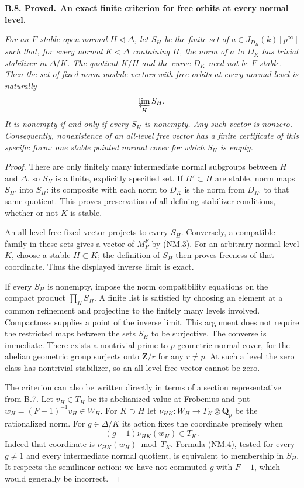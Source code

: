 \documentclass[11pt,a4paper]{article}
\newcommand{\Z}{\mathbf Z}
\newcommand{\Q}{\mathbf Q}
\newenvironment{claim}[3]{\par\medskip\noindent\hypertarget{#1}{\textbf{#1. #2.}}\ \textbf{#3.}\par\nopagebreak\smallskip\begingroup\itshape}{\endgroup\par\smallskip}
\newcommand{\statementref}[1]{\hyperlink{#1}{#1}}
\begin{document}
\begin{claim}{B.8}{Proved}{An exact finite criterion for free orbits at every normal level}
For an $F$-stable open normal $H\triangleleft\Delta$, let $S_H$
be the finite set of $a\in J_{D_H}(k)[p^\infty]$ such that, for
every normal $K\triangleleft\Delta$ containing $H$, the norm of
$a$ to $D_K$ has trivial stabilizer in $\Delta/K$. The quotient
$K/H$ and the curve $D_K$ need not be $F$-stable. Then the set of
fixed norm-module vectors with free orbits at every normal level
is naturally
\[
                         \varprojlim_H S_H.
\]
It is nonempty if and only if every $S_H$ is nonempty. Any such
vector is nonzero. Consequently, nonexistence of an all-level free
vector has a finite certificate of this specific form: one stable
pointed normal cover for which $S_H$ is empty.
\end{claim}
\begin{proof}
There are only finitely many intermediate normal subgroups between
$H$ and $\Delta$, so $S_H$ is a finite, explicitly specified set.
If $H'\subset H$ are stable, norm maps $S_{H'}$ into $S_H$:
its composite with each norm to $D_K$ is the norm from $D_{H'}$
to that same quotient. This proves preservation of all defining
stabilizer conditions, whether or not $K$ is stable.

An all-level free fixed vector projects to every $S_H$. Conversely,
a compatible family in these sets gives a vector of $M_P^F$ by
(NM.3). For an arbitrary normal level $K$, choose a stable
$H\subset K$; the definition of $S_H$ then proves freeness of
that coordinate. Thus the displayed inverse limit is exact.

If every $S_H$ is nonempty, impose the norm compatibility equations
on the compact product $\prod_H S_H$. A finite list is satisfied
by choosing an element at a common refinement and projecting to
the finitely many levels involved. Compactness supplies a point
of the inverse limit. This argument does not require the restricted
maps between the sets $S_H$ to be surjective. The converse is
immediate. There exists a nontrivial prime-to-$p$ geometric normal
cover, for the abelian geometric group surjects onto $\Z/r$ for
any $r\ne p$. At such a level the zero class has nontrivial
stabilizer, so an all-level free vector cannot be zero.

The criterion can also be written directly in terms of a section
representative from \statementref{B.7}. Let $v_H\in T_H$ be
its abelianized value at Frobenius and put
$w_H=(F-1)^{-1}v_H\in W_H$. For $K\supset H$ let
$\nu_{HK}:W_H\to T_K\otimes\Q_p$ be the rationalized norm.
For $g\in\Delta/K$ its action fixes the coordinate precisely when
\[
                         (g-1)\nu_{HK}(w_H)\in T_K.           \tag{NM.4}
\]
Indeed that coordinate is $\nu_{HK}(w_H)\bmod T_K$.
Formula (NM.4), tested for every $g\ne1$ and every intermediate
normal quotient, is equivalent to membership in $S_H$. It
respects the semilinear action: we have not commuted $g$ with
$F-1$, which would generally be incorrect.
\end{proof}
\end{document}
